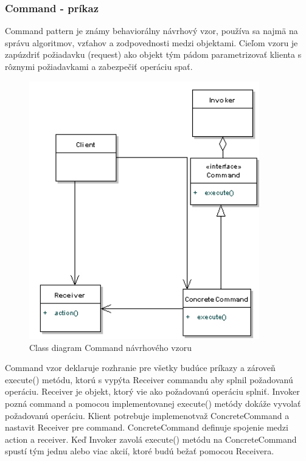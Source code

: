 \subsubsection{Command - príkaz}
\indent Command pattern je známy behaviorálny návrhový vzor, používa sa najmä na správu algoritmov, vzťahov a zodpovednosti medzi objektami. 
Cieľom vzoru je zapúzdriť požiadavku (request) ako objekt tým pádom parametrizovať klienta s rôznymi požiadavkami a zabezpečiť operáciu spať.\cite{designpattern}
\begin{figure}[!htbp]
	\centering
	\includegraphics[width=10cm]{img/command_pattern_class.jpg}
	\caption{Class diagram Command návrhového vzoru}
	\label{fig:test}
\end{figure}
\newline
Command vzor deklaruje rozhranie pre všetky budúce príkazy a zároveň execute() metódu, ktorú s vypýta Receiver commandu aby splnil požadovanú operáciu.
Receiver je objekt, ktorý vie ako požadovanú operáciu splniť. Invoker pozná command a pomocou implementovanej execute() metódy dokáže vyvolať požadovanú operáciu.
Klient potrebuje implemenotvaž ConcreteCommand a nastavit Receiver pre command. ConcreteCommand definuje spojenie medzi action a receiver. Keď Invoker zavolá execute() metódu na ConcreteCommand spustí tým jednu alebo viac akcií, ktoré budú bežať pomocou Receivera.\cite{designpattern}

